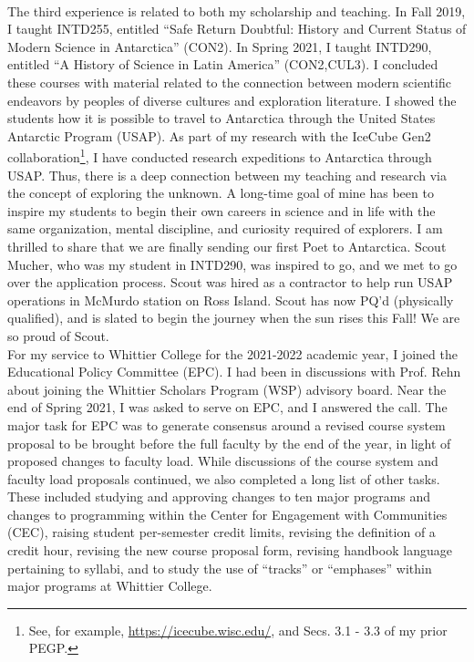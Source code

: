 \documentclass[../../main.tex]{subfiles}
\begin{document}
\\
\vspace{0.25cm}
The third experience is related to both my scholarship and teaching.  In Fall 2019, I taught INTD255, entitled ``Safe Return Doubtful: History and Current Status of Modern Science in Antarctica'' (CON2).  In Spring 2021, I taught INTD290, entitled ``A History of Science in Latin America'' (CON2,CUL3).  I concluded these courses with material related to the connection between modern scientific endeavors by peoples of diverse cultures and exploration literature.  I showed the students how it is possible to travel to Antarctica through the United States Antarctic Program (USAP).  As part of my research with the IceCube Gen2 collaboration\footnote{See, for example, \url{https://icecube.wisc.edu/}, and Secs. 3.1 - 3.3 of my prior PEGP.}, I have conducted research expeditions to Antarctica through USAP.  Thus, there is a deep connection between my teaching and research via the concept of exploring the unknown.  A long-time goal of mine has been to inspire my students to begin their own careers in science and in life with the same organization, mental discipline, and curiosity required of explorers.  I am thrilled to share that we are finally sending our first Poet to Antarctica.  Scout Mucher, who was my student in INTD290, was inspired to go, and we met to go over the application process.  Scout was hired as a contractor to help run USAP operations in McMurdo station on Ross Island.  Scout has now PQ'd (physically qualified), and is slated to begin the journey when the sun rises this Fall!  We are so proud of Scout.
\\
\vspace{0.25cm}
For my service to Whittier College for the 2021-2022 academic year, I joined the Educational Policy Committee (EPC).  I had been in discussions with Prof. Rehn about joining the Whittier Scholars Program (WSP) advisory board.  Near the end of Spring 2021, I was asked to serve on EPC, and I answered the call.  The major task for EPC was to generate consensus around a revised course system proposal to be brought before the full faculty by the end of the year, in light of proposed changes to faculty load.  While discussions of the course system and faculty load proposals continued, we also completed a long list of other tasks.  These included studying and approving changes to ten major programs and changes to programming within the Center for Engagement with Communities (CEC), raising student per-semester credit limits, revising the definition of a credit hour, revising the new course proposal form, revising handbook language pertaining to syllabi, and to study the use of ``tracks'' or ``emphases'' within major programs at Whittier College.
\end{document}
